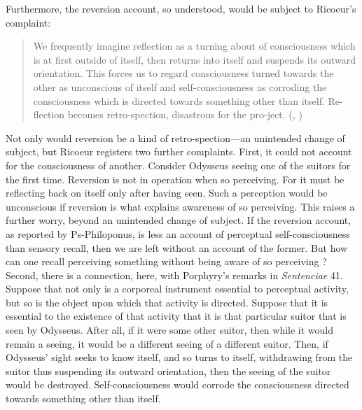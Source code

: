 Furthermore, the reversion account, so understood, would be subject to Ricoeur's complaint:
\begin{quote}
	We frequently imagine reflection as a turning about of consciousness which is at first outside of itself, then returns into itself and suspends its outward orientation. This forces us to regard consciousness turned towards the other as unconscious of itself and self-consciousness as corroding the consciousness which is directed towards something other than itself. Re-flection becomes retro-spection, disastrous for the pro-ject. (\citealt[59]{Ricoeur:1950cw}, \citeyear[60–1]{Ricoeur:1966hp})
\end{quote}
Not only would reversion be a kind of retro-spection—an unintended change of subject, but Ricoeur registers two further complaints. First, it could not account for the consciousness of another. Consider Odys\-seus seeing one of the suitors for the first time. Reversion is not in operation when so perceiving. For it must be reflecting back on itself only after having seen. Such a perception would be unconscious if reversion is what explains awareness of so perceiving. This raises a further worry, beyond an unintended change of subject. If the reversion account, as reported by Ps-Philoponus, is less an account of perceptual self-consciousness than sensory recall, then we are left without an account of the former. But how can one recall perceiving something without being aware of so perceiving \citep[18]{Zahavi:1999aa}? Second, there is a connection, here, with Porphyry's remarks in \emph{Sentenciae} 41. Suppose that not only is a corporeal instrument essential to perceptual activity, but so is the object upon which that activity is directed. Suppose that it is essential to the existence of that activity that it is that particular suitor that is seen by Odysseus. After all, if it were some other suitor, then while it would remain a seeing, it would be a different seeing of a different suitor. Then, if Odysseus' sight seeks to know itself, and so turns to itself, withdrawing from the suitor thus suspending its outward orientation, then the seeing of the suitor would be destroyed. Self-consciousness would corrode the consciousness directed towards something other than itself.

